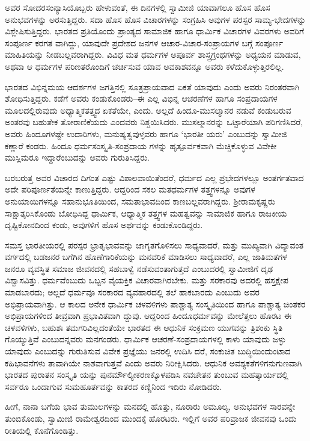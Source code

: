 ಅವರ ಸೋದರಸಂನ್ಯಾಸಿಯೊಬ್ಬರು ಹೇಳುವಂತೆ, ಈ ದಿನಗಳಲ್ಲಿ ಸ್ವಾಮೀಜಿ ಯಾವಾಗಲೂ ಹೊಸ ಹೊಸ ಅನುಭವಗಳನ್ನು ಅರಸುತ್ತಿದ್ದರು. ಸದಾ ಹೊಸ ಹೊಸ ವಿಚಾರಗಳನ್ನು ಸಂಗ್ರಹಿಸಿ ಅವುಗಳ ಪರಸ್ಪರ ಸಾಮ್ಯ-ಭೇದಗಳನ್ನು ವಿಶ್ಲೇಷಿಸುತ್ತಿದ್ದರು. ಭಾರತದ ಪ್ರತಿಯೊಂದು ಪ್ರಾಂತ್ಯದ ಸಾಮಾಜಿಕ ಹಾಗೂ ಧಾರ್ಮಿಕ ವಿಚಾರಗಳ ವಿವರಗಳು ಅವರಿಗೆ ಸಂಪೂರ್ಣ ಕರಗತ ವಾಗಿದ್ದು, ಯಾವುದೇ ಪ್ರದೇಶದ ಜನಗಳ ಆಚಾರ-ವಿಚಾರ-ಸಂಪ್ರಾಯಗಳ ಬಗ್ಗೆ ಸಂಪೂರ್ಣ ಮಾಹಿತಿಯನ್ನು ನೀಡಬಲ್ಲವರಾಗಿದ್ದರು. ವಿವಿಧ ಮತ ಧರ್ಮಗಳ ಅಪೂರ್ವ ಶಾಸ್ತ್ರಗ್ರಂಥಗಳನ್ನು ಅಧ್ಯಯನ ಮಾಡುವ, ಅಥವಾ ಆ ಧರ್ಮಗಳ ಪರಿಣತರೊಂದಿಗೆ ಚರ್ಚಿಸುವ ಯಾವ ಅವಕಾಶವನ್ನೂ ಅವರು ಕಳೆದುಕೊಳ್ಳುತ್ತಿರಲಿಲ್ಲ.

ಭಾರತದ ವಿಭಿನ್ನಮಯ ಆದರ್ಶಗಳ ಜಗತ್ತಿನಲ್ಲಿ ಸೂತ್ರಪ್ರಾಯವಾದ ಏಕತೆ ಯಾವುದು ಎಂದು ಅವರು ನಿರಂತರವಾಗಿ ಶೋಧಿಸುತ್ತಿದ್ದರು. ಕಡೆಗೆ ಅವರು ಕಂಡುಕೊಂಡರು–ಈ ಎಲ್ಲ ವಿಭಿನ್ನ ಆಚರಣೆಗಳ ಹಾಗೂ ಸಂಪ್ರದಾಯಗಳ ಮೂಲದಲ್ಲಿರುವುದು ಅಧ್ಯಾತ್ಮಿಕತತ್ತ್ವದ ಏಕತೆಯೇ, ಎಂದು. ಅಲ್ಲದೆ ಹಿಂದೂ-ಮುಸಲ್ಮಾನರ ನಡುವೆ ಕಂಡುಬರುವ ಅಂತರವು ಬಹುತೇಕ ತೋರಾಣಿಕೆಯದು ಎಂದವರು ನಿಶ್ಚಯಿಸಿದರು. ಮುಸಲ್ಮಾನರನ್ನು ಒಟ್ಟಾರೆಯಾಗಿ ಪರಿಗಣಿಸಿದರೆ, ಅವರು ಹಿಂದೂಗಳಷ್ಟೇ ಉದಾರಿಗಳು, ಮನುಷ್ಯತ್ವವುಳ್ಳವರು ಹಾಗೂ ‘ಭಾರತೀ ಯರು’ ಎಂಬುದನ್ನು ಸ್ವಾಮೀಜಿ ಕಣ್ಣಾರೆ ಕಂಡರು. ಹಿಂದೂ ಧರ್ಮಸಂಸ್ಕೃತಿ-ಸಂಪ್ರದಾಯ ಗಳನ್ನು ಹೃತ್ಪೂರ್ವಕವಾಗಿ ಮೆಚ್ಚಿಕೊಳ್ಳುವ ವಿವೇಕೀ ಮುಸ್ಲಿಮರೂ ಇದ್ದಾರೆಂಬುದನ್ನು ಅವರು ಗುರುತಿಸಿದ್ದರು.

ಬರಬರುತ್ತ ಅವರ ವಿಚಾರದ ದಿಗಂತ ಎಷ್ಟು ವಿಶಾಲವಾಯಿತೆಂದರೆ, ಧರ್ಮದ ಎಲ್ಲ ಪ್ರಭೇದಗಳಲ್ಲೂ ಅಂತರ್ಗತವಾದ ಅದೇ ಪರಿಪೂರ್ಣತೆಯನ್ನೇ ಕಾಣುತ್ತಿದ್ದರು. ಆದ್ದರಿಂದ ಸಕಲ ಮತಧರ್ಮಗಳ ತತ್ತ್ವಗಳನ್ನೂ ಅವುಗಳ ಅನುಯಾಯಿಗಳನ್ನೂ ಸಹಾನುಭೂತಿಯಿಂದ, ಸಮತಾಭಾವದಿಂದ ಕಾಣಬಲ್ಲವರಾಗಿದ್ದರು. ಶ್ರೀರಾಮಕೃಷ್ಣರು ಸಾಕ್ಷಾತ್ಕರಿಸಿಕೊಂಡು ಬೋಧಿಸಿದ್ದ ಧಾರ್ಮಿಕ, ಆಧ್ಯಾತ್ಮಿಕ ತತ್ತ್ವಗಳ ಮಹತ್ವವನ್ನು ಸಾಮಾಜಿಕ ಹಾಗೂ ರಾಜಕೀಯ ದೃಷ್ಟಿಕೋನದಿಂದ ಕಂಡು, ಅವುಗಳಿಗೆ ಹೊಸ ಅರ್ಥವನ್ನು ಕಂಡುಕೊಂಡಿದ್ದರು.

ಸಮಸ್ತ ಭಾರತೀಯರಲ್ಲಿ ಪರಸ್ಪರ ಭ್ರಾತೃಭಾವವನ್ನು ಜಾಗೃತಗೊಳಿಸಲು ಸಾಧ್ಯವಾದರೆ, ಮತ್ತು ಮುಖ್ಯವಾಗಿ ವಿದ್ಯಾವಂತ ವರ್ಗದಲ್ಲಿ ಬಡಜನರ ಬಗೆಗಿನ ಹೊಣೆಗಾರಿಕೆಯನ್ನು ಮನವರಿಕೆ ಮಾಡಿಸಲು ಸಾಧ್ಯವಾದರೆ, ಎಲ್ಲ ಜಾತಿಮತಗಳ ಜನರೂ ವ್ಯವಸ್ಥಿತ ಸಮಾಜ ಜೀವನದಲ್ಲಿ ಸಹಬಾಳ್ವೆ ನಡೆಸುವಂತಾಗುತ್ತದೆ ಎಂಬುದರಲ್ಲಿ ಸ್ವಾಮೀಜಿಗೆ ದೃಢ ವಿಶ್ವಾಸವಿತ್ತು. ಧರ್ಮವೆಂಬುದು ಒಬ್ಬನ ವೈಯಕ್ತಿಕ ವಿಚಾರವಾಗಿರಬೇಕು. ಮತ್ತು ಸರಕಾರವು ಅದರಲ್ಲಿ ಹಸ್ತಕ್ಷೇಪ ಮಾಡಬಾರದು; ಅಲ್ಲದೆ ಧರ್ಮವೂ ಸರಕಾರದ ವ್ಯವಹಾರದಲ್ಲಿ ತಲೆ ಹಾಕಬಾರದು ಎಂಬುದು ಅವರ ಅಭಿಪ್ರಾಯವಾಗಿತ್ತು. ಆ ಕಾಲದ ಅನೇಕ ಧಾರ್ಮಿಕ ಚಳವಳಿಗಳು ಪಾಶ್ಚಾತ್ಯ ಸಂಸ್ಕೃತಿಯಿಂದ ಹಾಗೂ ಪಾಶ್ಚಾತ್ಯ ಚಿಂತಕರ ಅಭಿಪ್ರಾಯಗಳಿಂದ ತೀವ್ರವಾಗಿ ಪ್ರಭಾವಿತವಾಗಿ ದ್ದುವು. ಆದ್ದರಿಂದ ಹಿಂದೂಧರ್ಮವನ್ನು ಮೇಲೆತ್ತಲು ಹೊರಟ ಈ ಚಳವಳಿಗಳು, ಬಹುಶಃ ತಮಗರಿವಿಲ್ಲದಂತೆಯೇ ಭಾರತದ ಈ ಆಧುನಿಕ ಸಂಕ್ರಮಣ ಯುಗವನ್ನು ತ್ರಿಶಂಕು ಸ್ಥಿತಿ ಗೊಯ್ಯುತ್ತಿವೆ ಎಂಬುದನ್ನವರು ಮನಗಂಡರು. ಧಾರ್ಮಿಕ ಆಚರಣೆ-ಸಂಪ್ರದಾಯಗಳಲ್ಲಿ ಕಾಳು ಯಾವುದು ಜಳ್ಳು ಯಾವುದು ಎಂಬುದನ್ನು ಗುರುತಿಸುವ ವಿವೇಕ ಪ್ರಜ್ಞೆಯು ಜನರಲ್ಲಿ ಉದಿಸಿ ದರೆ, ಸಂಕುಚಿತ ಬುದ್ಧಿಯಿಂದುಂಟಾದ ಕಹಿಭಾವನೆಗಳು ತಾವಾಗಿಯೇ ನಾಶವಾಗುತ್ತವೆ ಎಂದು ಅವರು ನಿರೀಕ್ಷಿಸಿದರು. ಆಧುನಿಕ ಅವಶ್ಯಕತೆಗಳಿಗನುಗುಣವಾಗಿ ಭಾರತದ ಪುರಾತನ ಸಂಸ್ಕೃತಿ ಯನ್ನು ಪುನರ್ಮೌಲ್ಯೀಕರಣಕ್ಕೊಳಪಡಿಸಿ ನವಚೇತನ ತುಂಬುವ ಮಹತ್ಕಾರ್ಯದಲ್ಲಿ ಸರ್ವರೂ ಒಂದಾಗುವ ಸುಮಹೂರ್ತವನ್ನು ಕಾತರದ ಕಣ್ಣಿನಿಂದ ಇದಿರು ನೋಡಿದರು.

\delimiter

ಹೀಗೆ, ನಾನಾ ಬಗೆಯ ಭಾವ ತುಮುಲಗಳನ್ನು ಮನದಲ್ಲಿ ಹೊತ್ತು, ನೂರಾರು ಅಮೂಲ್ಯ, ಅನುಭವಗಳ ಸಾರವನ್ನೇ ತುಂಬಿಕೊಂಡು, ಸ್ವಾಮೀಜಿ ರಾಮೇಶ್ವರದಿಂದ ಮುಂದಕ್ಕೆ ಹೊರಟರು. ಇಲ್ಲಿಗೆ ಅವರ ಪರಿವ್ರಾಜಕ ಜೀವನವು ಒಂದು ರೀತಿಯಲ್ಲಿ ಕೊನೆಗೊಂಡಿತ್ತು.

